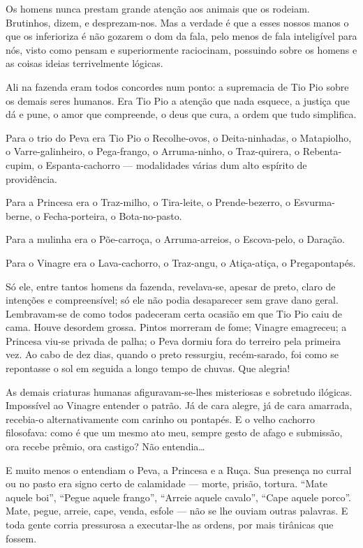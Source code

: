Os homens nunca prestam grande atenção aos animais que os rodeiam.
Brutinhos, dizem, e desprezam-nos. Mas a verdade é que a esses nossos
manos o que os inferioriza é não gozarem o dom da fala, pelo menos de
fala inteligível para nós, visto como pensam e superiormente raciocinam,
possuindo sobre os homens e as coisas ideias terrivelmente lógicas.

Ali na fazenda eram todos concordes num ponto: a supremacia de Tio Pio
sobre os demais seres humanos. Era Tio Pio a atenção que nada esquece, a
justiça que dá e pune, o amor que compreende, o deus que cura, a ordem
que tudo simplifica.

Para o trio do Peva era Tio Pio o Recolhe-ovos, o Deita-ninhadas, o
Matapiolho, o Varre-galinheiro, o Pega-frango, o Arruma-ninho, o
Traz-quirera, o Rebenta-cupim, o Espanta-cachorro --- modalidades várias
dum alto espírito de providência.

Para a Princesa era o Traz-milho, o Tira-leite, o Prende-bezerro, o
Esvurma-berne, o Fecha-porteira, o Bota-no-pasto.

Para a mulinha era o Põe-carroça, o Arruma-arreios, o Escova-pelo, o
Daração.

Para o Vinagre era o Lava-cachorro, o Traz-angu, o Atiça-atiça, o
Pregapontapés.

Só ele, entre tantos homens da fazenda, revelava-se, apesar de preto,
claro de intenções e compreensível; só ele não podia desaparecer sem
grave dano geral. Lembravam-se de como todos padeceram certa ocasião em
que Tio Pio caiu de cama. Houve desordem grossa. Pintos morreram de
fome; Vinagre emagreceu; a Princesa viu-se privada de palha; o Peva
dormiu fora do terreiro pela primeira vez. Ao cabo de dez dias, quando o
preto ressurgiu, recém-sarado, foi como se repontasse o sol em seguida a
longo tempo de chuvas. Que alegria!

As demais criaturas humanas afiguravam-se-lhes misteriosas e sobretudo
ilógicas. Impossível ao Vinagre entender o patrão. Já de cara alegre, já
de cara amarrada, recebia-o alternativamente com carinho ou pontapés. E
o velho cachorro filosofava: como é que um mesmo ato meu, sempre gesto
de afago e submissão, ora recebe prêmio, ora castigo? Não entendia\ldots{}

E muito menos o entendiam o Peva, a Princesa e a Ruça. Sua presença no
curral ou no pasto era signo certo de calamidade --- morte, prisão,
tortura. ``Mate aquele boi'', ``Pegue aquele frango'', ``Arreie aquele
cavalo'', ``Cape aquele porco''. Mate, pegue, arreie, cape, venda,
esfole --- não se lhe ouviam outras palavras. E toda gente corria
pressurosa a executar-lhe as ordens, por mais tirânicas que fossem.


